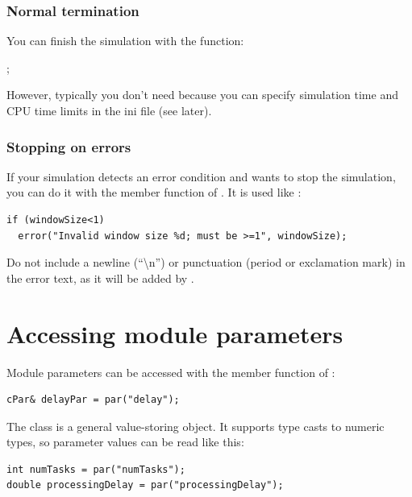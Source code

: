 \subsubsection{Normal termination}


You can finish the simulation with the  function:


;


However, typically you don't need  because you
can specify simulation time and CPU time limits in the ini file (see later).


\subsubsection{Stopping on errors}


If your simulation detects an error condition and wants to stop
the simulation, you can do it with the  member function
of . It is used like :

\begin{verbatim}
if (windowSize<1)
  error("Invalid window size %d; must be >=1", windowSize);
\end{verbatim}


Do not include a newline (``{\textbackslash}n'') or punctuation (period
or exclamation mark) in the error text, as it will be added by {\opp}.





\section{Accessing module parameters}
\label{ch:simple-modules:parameters}

Module parameters can be accessed
with the  member function of :

\begin{verbatim}
cPar& delayPar = par("delay");
\end{verbatim}

The  class is a general value-storing object. It supports
type casts to numeric types, so parameter values can be read
like this:

\begin{verbatim}
int numTasks = par("numTasks");
double processingDelay = par("processingDelay");
\end{verbatim}

